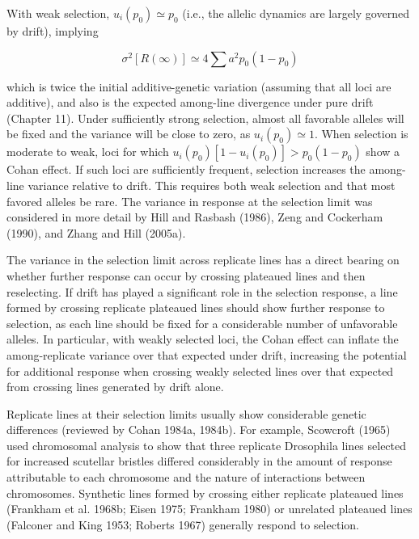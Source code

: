 \documentclass{article}
\begin{document}
With weak selection,  $ u_i(p_0) \simeq p_0 $ (i.e., the allelic dynamics are largely governed by drift), implying

\begin{equation}
\sigma^{2}\left[R(\infty)\right]\simeq4\sum a^{2}p_{0}(1-p_{0})
\tag{26.13b}
\label{eq:26_13b}
\end{equation}

which is twice the initial additive-genetic variation (assuming that all loci are additive), and also is the expected among-line divergence under pure drift (Chapter 11). Under sufficiently strong selection, almost all favorable alleles will be fixed and the variance will be close to zero, as  $ u_i(p_0) \simeq 1 $. When selection is moderate to weak, loci for which  $ u_i(p_0)[1 - u_i(p_0)] > p_0(1 - p_0) $ show a Cohan effect. If such loci are sufficiently frequent, selection increases the among-line variance relative to drift. This requires both weak selection and that most favored alleles be rare. The variance in response at the selection limit was considered in more detail by Hill and Rasbash (1986), Zeng and Cockerham (1990), and Zhang and Hill (2005a).

The variance in the selection limit across replicate lines has a direct bearing on whether further response can occur by crossing plateaued lines and then reselecting. If drift has played a significant role in the selection response, a line formed by crossing replicate plateaued lines should show further response to selection, as each line should be fixed for a considerable number of unfavorable alleles. In particular, with weakly selected loci, the Cohan effect can inflate the among-replicate variance over that expected under drift, increasing the potential for additional response when crossing weakly selected lines over that expected from crossing lines generated by drift alone.

Replicate lines at their selection limits usually show considerable genetic differences (reviewed by Cohan 1984a, 1984b). For example, Scowcroft (1965) used chromosomal analysis to show that three replicate Drosophila lines selected for increased scutellar bristles differed considerably in the amount of response attributable to each chromosome and the nature of interactions between chromosomes. Synthetic lines formed by crossing either replicate plateaued lines (Frankham et al. 1968b; Eisen 1975; Frankham 1980) or unrelated plateaued lines (Falconer and King 1953; Roberts 1967) generally respond to selection.
\end{document}
